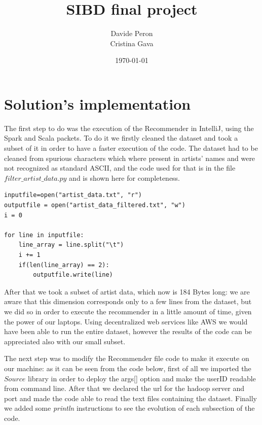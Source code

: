 \documentclass[11pt,a4paper,titlepage]{article}
\title{\blue SIBD final project}
\author{Davide Peron\\ Cristina Gava}
\date{\today}
\begin{document}
\maketitle
\section{Solution's implementation}
The first step to do was the execution of the Recommender in IntelliJ, using the Spark and Scala packets. To do it we firstly cleaned the dataset and took a subset of it in order to have a faster execution of the code. The dataset had to be cleaned from spurious characters which where present in artists' names and were not recognized as standard ASCII, and the code used for that is in the file \textit{$filter\_artist\_data.py$} and is shown here for completeness.

\begin{lstlisting}[style=myScalastyle]
inputfile=open("artist_data.txt", "r")
outputfile = open("artist_data_filtered.txt", "w")
i = 0

for line in inputfile:
    line_array = line.split("\t")
    i += 1
    if(len(line_array) == 2):
        outputfile.write(line)
\end{lstlisting}

After that we took a subset of artist data, which now is 184 Bytes long: we are aware that this dimension corresponds only to a few lines from the dataset, but  we did so in order to execute the recommender in a little amount of time, given the power of our laptops. Using decentralized web services like AWS we would have been able to run the entire dataset, however the results of the code can be appreciated also with our small subset.

The next step was to modify the Recommender file code to make it execute on our machine: as it can be seen from the code below, first of all we imported the $Source$ library in order to deploy the args[] option and make the userID readable from command line. After that we declared the url for the hadoop server and port and made the code able to read the text files containing the dataset. Finally we added some \textit{println} instructions to see the evolution of each subsection of the code.
\end{document}
